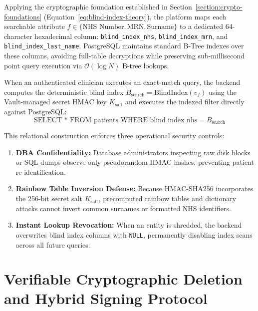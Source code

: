 Applying the cryptographic foundation established in Section~\ref{section:crypto-foundations} (Equation~\ref{eq:blind-index-theory}), the platform maps each searchable attribute $f \in \{\text{NHS Number}, \text{MRN}, \text{Surname}\}$ to a dedicated 64-character hexadecimal column: \texttt{blind\_index\_nhs}, \texttt{blind\_index\_mrn}, and \texttt{blind\_index\_last\_name}. PostgreSQL maintains standard B-Tree indexes over these columns, avoiding full-table decryptions while preserving sub-millisecond point query execution via $\mathcal{O}(\log N)$ B-tree lookups.

When an authenticated clinician executes an exact-match query, the backend computes the deterministic blind index $B_{\text{search}} = \text{BlindIndex}(v_f)$ using the Vault-managed secret HMAC key $K_{\text{salt}}$ and executes the indexed filter directly against PostgreSQL:
\begin{equation}
    \text{SELECT * FROM patients WHERE blind\_index\_nhs} = B_{\text{search}}
    \label{eq:sql-blind-search}
\end{equation}

This relational construction enforces three operational security controls:
\begin{enumerate}
    \item \textbf{DBA Confidentiality:} Database administrators inspecting raw disk blocks or SQL dumps observe only pseudorandom HMAC hashes, preventing patient re-identification.
    \item \textbf{Rainbow Table Inversion Defense:} Because HMAC-SHA256 incorporates the 256-bit secret salt $K_{\text{salt}}$, precomputed rainbow tables and dictionary attacks cannot invert common surnames or formatted NHS identifiers.
    \item \textbf{Instant Lookup Revocation:} When an entity is shredded, the backend overwrites blind index columns with \texttt{NULL}, permanently disabling index scans across all future queries.
\end{enumerate}


\section{Verifiable Cryptographic Deletion and Hybrid Signing Protocol}\label{section:shredding-proofs}

